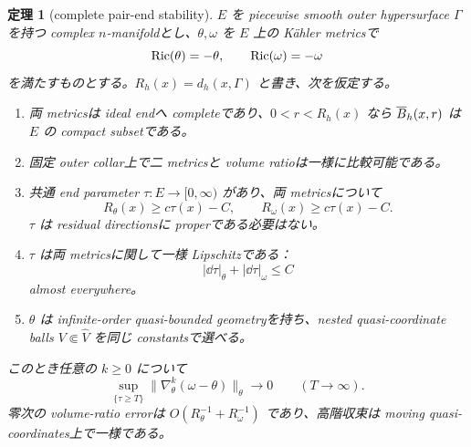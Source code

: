 \documentclass[11pt,a4paper]{ltjsarticle}
\theoremstyle{plain}
\newtheorem{theorem}{定理}[section]\newtheorem{proposition}[theorem]{命題}
\theoremstyle{definition}
\theoremstyle{remark}
\begin{document}
\begin{theorem}[complete pair-end stability]\label{thm:pair-end-stability}
$E$ を piecewise smooth outer hypersurface $\Gamma$ を持つ complex $n$-manifoldとし、$\theta,\omega$ を $E$ 上の K\"ahler metricsで
\[
 \operatorname{Ric}(\theta)=-\theta,
 \qquad
 \operatorname{Ric}(\omega)=-\omega
\]
を満たすものとする。$R_h(x)=d_h(x,\Gamma)$ と書き、次を仮定する。
\begin{enumerate}[label=(P\arabic*)]
 \item\label{P1} 両 metricsは ideal endへ completeであり、$0<r<R_h(x)$ なら $\overline B_h(x,r)$ は $E$ の compact subsetである。
 \item\label{P2} 固定 outer collar上で二 metricsと volume ratioは一様に比較可能である。
 \item\label{P3} 共通 end parameter $\tau:E\to[0,\infty)$ があり、両 metricsについて
 \[
 R_\theta(x)\ge c\tau(x)-C,
 \qquad
 R_\omega(x)\ge c\tau(x)-C.
 \]
 $\tau$ は residual directionsに properである必要はない。
 \item\label{P4} $\tau$ は両 metricsに関して一様 Lipschitzである：
 \[
 |\dd\tau|_\theta+|\dd\tau|_\omega\le C
 \]
 almost everywhere。
 \item\label{P5} $\theta$ は infinite-order quasi-bounded geometryを持ち、nested quasi-coordinate balls $V\Subset\widehat V$ を同じ constantsで選べる。
\end{enumerate}
このとき任意の $k\ge0$ について
\[
 \sup_{\{\tau\ge T\}}
 \|\nabla_\theta^k(\omega-\theta)\|_\theta
 \longrightarrow0
 \qquad(T\to\infty).
\]
零次の volume-ratio errorは $O(R_\theta^{-1}+R_\omega^{-1})$ であり、高階収束は moving quasi-coordinates上で一様である。
\end{theorem}
\end{document}

